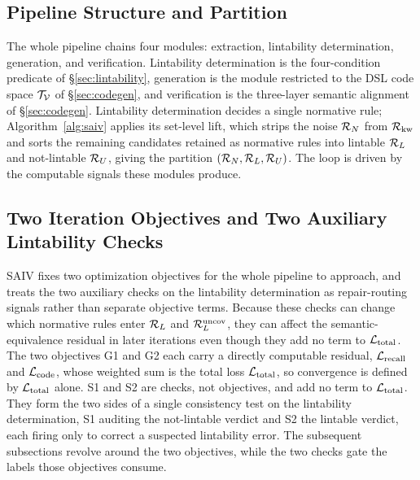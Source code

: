 \subsection{Pipeline Structure and Partition}
\label{subsec:saiv-formal}

The whole pipeline chains four modules: extraction, lintability determination,
generation, and verification. Lintability determination is the four-condition
predicate of \S\ref{sec:lintability}, generation is the module restricted to the
DSL code space $\mathcal{T}_{\mathcal{V}}$ of \S\ref{sec:codegen}, and verification is the three-layer
semantic alignment of \S\ref{sec:codegen}. Lintability determination decides a
single normative rule; Algorithm~\ref{alg:saiv} applies its set-level lift, which
strips the noise $\mathcal{R}_N$ from $\mathcal{R}_{\mathrm{kw}}$ and sorts the remaining candidates retained as
normative rules into lintable $\mathcal{R}_L$ and not-lintable $\mathcal{R}_U$, giving the partition
$(\mathcal{R}_N, \mathcal{R}_L, \mathcal{R}_U)$. The loop is driven by the computable signals these modules
produce.

\subsection{Two Iteration Objectives and Two Auxiliary Lintability Checks}
\label{subsec:targets}

SAIV fixes two optimization objectives
for the whole pipeline to approach, and treats the two auxiliary checks
on the lintability determination as repair-routing signals rather than
separate objective terms. Because these checks can change which normative rules enter
$\mathcal{R}_L$ and $\mathcal{R}_L^{\mathrm{uncov}}$, they can affect the semantic-equivalence residual in later iterations
even though they add no term to $\mathcal{L}_{\mathrm{total}}$. The two objectives G1 and G2 each carry
a directly computable residual, $\mathcal{L}_{\mathrm{recall}}$ and $\mathcal{L}_{\mathrm{code}}$, whose weighted sum is the
total loss $\mathcal{L}_{\mathrm{total}}$, so convergence is defined by $\mathcal{L}_{\mathrm{total}}$ alone. S1 and S2 are
checks, not objectives, and add no term to $\mathcal{L}_{\mathrm{total}}$. They form the two sides of a
single consistency test on the lintability determination, S1 auditing the
not-lintable verdict and S2
the lintable verdict, each firing only to correct a suspected lintability error.
The subsequent subsections revolve around the two objectives, while the two
checks gate the labels those objectives consume.

